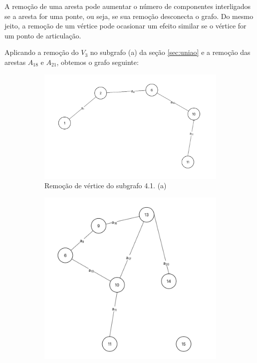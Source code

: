 \documentclass[
12pt,
a4paper,
semrecuonosumario,
sumario = abnt-6027-2012]{report}
\begin{document}
    A remoção de uma aresta pode aumentar o número de componentes interligados se a aresta for uma ponte, ou seja, se sua remoção desconecta o grafo. Do mesmo jeito, a remoção de um vértice pode ocasionar um efeito similar se o vértice for um ponto de articulação.

    Aplicando a remoção do $V_3$ no subgrafo (a) da seção \ref{sec:uniao} e a remoção das arestas $A_{18}$ e $A_{21}$, obtemos o grafo seguinte:

    \begin{figure}[!h]
            \centering %

            \begin{subfigure}[b]{0.48\textwidth}
                \centering
                \includegraphics[width=\textwidth]{figuras/subgrafos/subgrafo_remocao_vertice.png} %
                \caption{Remoção de vértice do subgrafo 4.1. (a)}
                \label{fig:remocaoVertice}
            \end{subfigure}
            \hfill %
            \begin{subfigure}[b]{0.48\textwidth}
                \centering
                \includegraphics[width=\textwidth]{figuras/subgrafos/subgrafo_remocao_aresta.png} %

\end{subfigure}
\end{figure}
\end{document}

